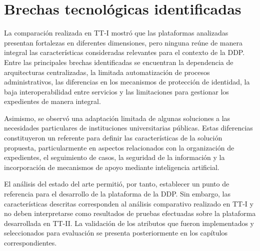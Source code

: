 \normalsize

\setlength{\tabcolsep}{6pt}

\renewcommand{\arraystretch}{1}

\section{Brechas tecnológicas identificadas}

La comparación realizada en TT-I mostró que las plataformas analizadas presentan fortalezas en diferentes dimensiones, pero ninguna reúne de manera integral las características consideradas relevantes para el contexto de la DDP. Entre las principales brechas identificadas se encuentran la dependencia de arquitecturas centralizadas, la limitada automatización de procesos administrativos, las diferencias en los mecanismos de protección de identidad, la baja interoperabilidad entre servicios y las limitaciones para gestionar los expedientes de manera integral.

Asimismo, se observó una adaptación limitada de algunas soluciones a las necesidades particulares de instituciones universitarias públicas. Estas diferencias constituyeron un referente para definir las características de la solución propuesta, particularmente en aspectos relacionados con la organización de expedientes, el seguimiento de casos, la seguridad de la información y la incorporación de mecanismos de apoyo mediante inteligencia artificial.

El análisis del estado del arte permitió, por tanto, establecer un punto de referencia para el desarrollo de la plataforma de la DDP. Sin embargo, las características descritas corresponden al análisis comparativo realizado en TT-I y no deben interpretarse como resultados de pruebas efectuadas sobre la plataforma desarrollada en TT-II. La validación de los atributos que fueron implementados y seleccionados para evaluación se presenta posteriormente en los capítulos correspondientes.